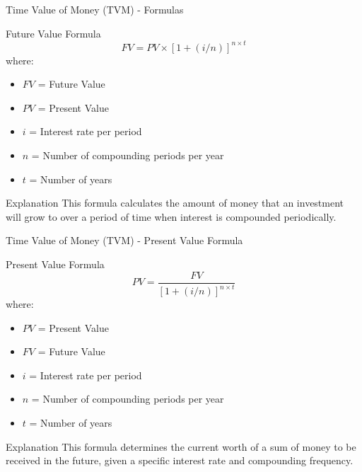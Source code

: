 \documentclass{beamer}
\begin{document}
\begin{frame}{Time Value of Money (TVM) - Formulas}
  \begin{block}{Future Value Formula}
    \begin{equation*}
      FV = PV \times [1 + (i / n)]^{n \times t}
    \end{equation*}
    where:
    \begin{itemize}
      \item \( FV \) = Future Value
      \item \( PV \) = Present Value
      \item \( i \) = Interest rate per period
      \item \( n \) = Number of compounding periods per year
      \item \( t \) = Number of years
    \end{itemize}
  \end{block}
  \begin{block}{Explanation}
    This formula calculates the amount of money that an investment will grow to over a period of time when interest is compounded periodically. 
  \end{block}
\end{frame}

\begin{frame}{Time Value of Money (TVM) - Present Value Formula}
  \begin{block}{Present Value Formula}
    \begin{equation*}
      PV = \frac{FV}{[1 + (i / n)]^{n \times t}}
    \end{equation*}
    where:
    \begin{itemize}
      \item \( PV \) = Present Value
      \item \( FV \) = Future Value
      \item \( i \) = Interest rate per period
      \item \( n \) = Number of compounding periods per year
      \item \( t \) = Number of years
    \end{itemize}
  \end{block}
  \begin{block}{Explanation}
    This formula determines the current worth of a sum of money to be received in the future, given a specific interest rate and compounding frequency.
  \end{block}
\end{frame}
\end{document}
